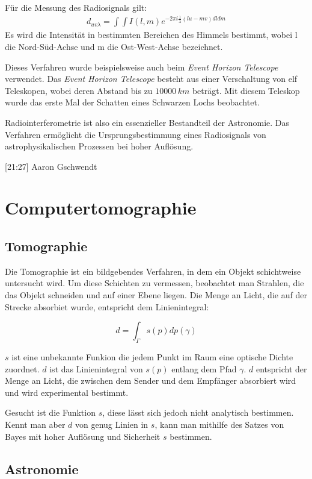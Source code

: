 \documentclass[]{dsadokumentation}
\begin{document}
Für die Messung des Radiosignals gilt:
\begin{eqnarray}
d_{uv\lambda} =\int\int I(l,m)e^{-2\pi i \frac{1}{\lambda}(lu-mv)dldm}
\end{eqnarray}
Es wird die Intensität in bestimmten Bereichen des Himmels bestimmt, wobei l die Nord-Süd-Achse und m die Ost-West-Achse bezeichnet.

Dieses Verfahren wurde beispielsweise auch beim \emph{Event Horizon Telescope} verwendet. Das \emph{Event Horizon Telescope} besteht aus einer Verschaltung von elf Teleskopen, wobei deren Abstand bis zu $10000\,km$ beträgt. Mit diesem Teleskop wurde das erste Mal der Schatten eines Schwarzen Lochs beobachtet.

Radiointerferometrie ist also ein essenzieller Bestandteil der Astronomie. Das Verfahren ermöglicht die Ursprungsbestimmung eines Radiosignals von astrophysikalischen Prozessen bei hoher Auflösung.




[21:27] Aaron Gschwendt
\section{Computertomographie}\label{k4.2.comptomo.ct}
\subsection{Tomographie}

Die Tomographie ist ein bildgebendes Verfahren, in dem ein Objekt schichtweise untersucht wird. Um diese Schichten zu vermessen, beobachtet man Strahlen, die das Objekt schneiden und auf einer Ebene liegen. Die Menge an Licht, die auf der Strecke absorbiet wurde, entspricht dem Linienintegral:

$$d=\int_{\Gamma}{}s(p)dp(\gamma)$$

$s$ ist eine unbekannte Funkion die jedem Punkt im Raum eine optische Dichte zuordnet. $d$ ist das Linienintegral von $s(p)$ entlang dem Pfad $\gamma$. $d$ entspricht der Menge an Licht, die zwischen dem Sender und dem Empfänger absorbiert wird und wird experimental bestimmt.

Gesucht ist die Funktion $s$, diese lässt sich jedoch nicht analytisch bestimmen. Kennt man aber $d$ von genug Linien in $s$, kann man mithilfe des Satzes von Bayes mit hoher Auflösung und Sicherheit $s$ bestimmen.

\subsection{Astronomie}
\end{document}
